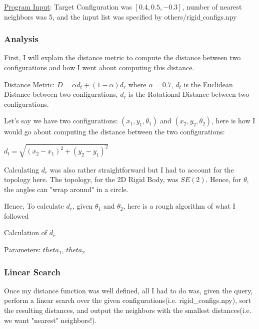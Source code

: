 \documentclass{article}
\begin{document}
\underline{Program Input}: Target Configuration was $[0.4, 0.5, -0.3]$, number of nearest neighbors was 5, and the input list was specified by others/rigid$\_$configs.npy

\subsubsection{Analysis}
First, I will explain the distance metric to compute the distance between two configurations and how I went about computing this distance.  \newline 

Distance Metric: $D = \alpha d_t + (1 - \alpha) d_r$ \newline 
where $\alpha = 0.7$, $d_t$ is the Euclidean Distance between two configurations, $d_r$ is the Rotational Distance between two configurations. 

Let's say we have two configurations: $(x_1, y_1, \theta_1)$ and $(x_2, y_2, \theta_2)$, here is how I would go about computing the distance between the two configurations: \newline 

$d_t = \sqrt{(x_2 - x_1)^2 + (y_2 - y_1)^2}$ \newline 

Calculating $d_r$ was also rather straightforward but I had to account for the topology here. The topology, for the 2D Rigid Body, was $SE(2)$. Hence, for $\theta$, the angles can "wrap around" in a circle. 

Hence, To calculate $d_r$, given $\theta_1$ and $\theta_2$, here is a rough algorithm of what I followed


\begin{algorithm}
\caption{Calculation of $d_r$}
\begin{algorithmic}
\STATE Parameters: $theta_1$, $theta_2$


\end{algorithmic}
\end{algorithm}

\subsubsection{Linear Search}
Once my distance function was well defined, all I had to do was, given the query, perform a linear search over the given configurations(i.e. rigid\_configs.npy), sort the resulting distances, and output the neighbors with the smallest distances(i.e. we want "nearest" neighbors!). 
\end{document}
